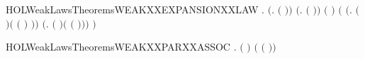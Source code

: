 \begin{SaveVerbatim}{HOLWeakLawsTheoremsWEAKXXEXPANSIONXXLAW}
\HOLTokenTurnstile{} \HOLSymConst{\HOLTokenForall{}}   .
       \ensuremath{(}\HOLSymConst{\HOLTokenForall{}}.  \HOLSymConst{\HOLTokenLeq{}}  \HOLSymConst{\HOLTokenImp{}}  \ensuremath{(} \ensuremath{)}\ensuremath{)} \HOLSymConst{\HOLTokenConj{}}
       \ensuremath{(}\HOLSymConst{\HOLTokenForall{}}.  \HOLSymConst{\HOLTokenLeq{}}  \HOLSymConst{\HOLTokenImp{}}  \ensuremath{(} \ensuremath{)}\ensuremath{)} \HOLSymConst{\HOLTokenImp{}}
        \ensuremath{(}   \HOLSymConst{\ensuremath{\mid}}   \ensuremath{)}
         \ensuremath{(}
            \ensuremath{(}\HOLTokenLambda{}.  \ensuremath{(} \ensuremath{)}\HOLSymConst{\ensuremath{\ldotp}}\ensuremath{(} \ensuremath{(} \ensuremath{)} \HOLSymConst{\ensuremath{\mid}}   \ensuremath{)}\ensuremath{)}
             \HOLSymConst{\ensuremath{+}}
            \ensuremath{(}\HOLTokenLambda{}.  \ensuremath{(} \ensuremath{)}\HOLSymConst{\ensuremath{\ldotp}}\ensuremath{(}   \HOLSymConst{\ensuremath{\mid}}  \ensuremath{(} \ensuremath{)}\ensuremath{)}\ensuremath{)}
             \HOLSymConst{\ensuremath{+}}     \ensuremath{)}
\end{SaveVerbatim}
\newcommand{\HOLWeakLawsTheoremsWEAKXXEXPANSIONXXLAW}{\UseVerbatim{HOLWeakLawsTheoremsWEAKXXEXPANSIONXXLAW}}
\begin{SaveVerbatim}{HOLWeakLawsTheoremsWEAKXXPARXXASSOC}
\HOLTokenTurnstile{} \HOLSymConst{\HOLTokenForall{}}  .  \ensuremath{(} \HOLSymConst{\ensuremath{\mid}}  \HOLSymConst{\ensuremath{\mid}} \ensuremath{)} \ensuremath{(} \HOLSymConst{\ensuremath{\mid}} \ensuremath{(} \HOLSymConst{\ensuremath{\mid}} \ensuremath{)}\ensuremath{)}
\end{SaveVerbatim}
